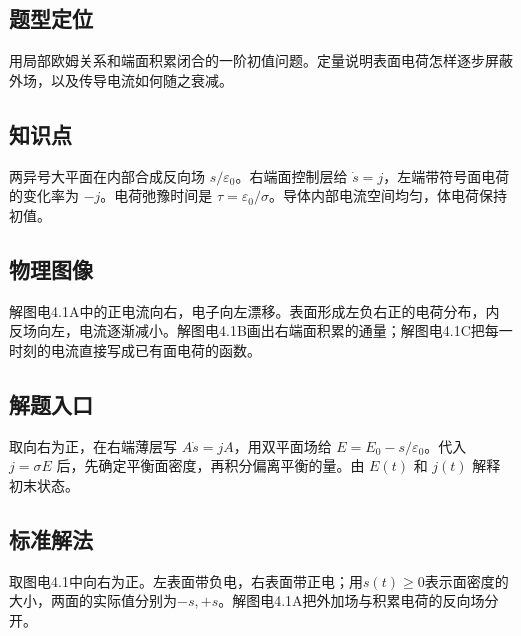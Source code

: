 \documentclass[UTF8,fontset=fandol,a4paper,11pt]{ctexart}
\begin{document}


\subsection*{题型定位}

用局部欧姆关系和端面积累闭合的一阶初值问题。定量说明表面电荷怎样逐步屏蔽外场，以及传导电流如何随之衰减。



\subsection*{知识点}

两异号大平面在内部合成反向场 $s/\varepsilon_0$。右端面控制层给 $\dot s=j$，左端带符号面电荷的变化率为 $-j$。电荷弛豫时间是 $\tau=\varepsilon_0/\sigma$。导体内部电流空间均匀，体电荷保持初值。



\subsection*{物理图像}

解图电4.1A中的正电流向右，电子向左漂移。表面形成左负右正的电荷分布，内反场向左，电流逐渐减小。解图电4.1B画出右端面积累的通量；解图电4.1C把每一时刻的电流直接写成已有面电荷的函数。



\subsection*{解题入口}

取向右为正，在右端薄层写 $A\dot s=jA$，用双平面场给 $E=E_0-s/\varepsilon_0$。代入 $j=\sigma E$ 后，先确定平衡面密度，再积分偏离平衡的量。由 $E(t)$ 和 $j(t)$ 解释初末状态。


\subsection*{标准解法}

取图电4.1中向右为正。左表面带负电，右表面带正电；用$s(t)\ge0$表示面密度的大小，两面的实际值分别为$-s,+s$。解图电4.1A把外加场与积累电荷的反向场分开。
\end{document}
